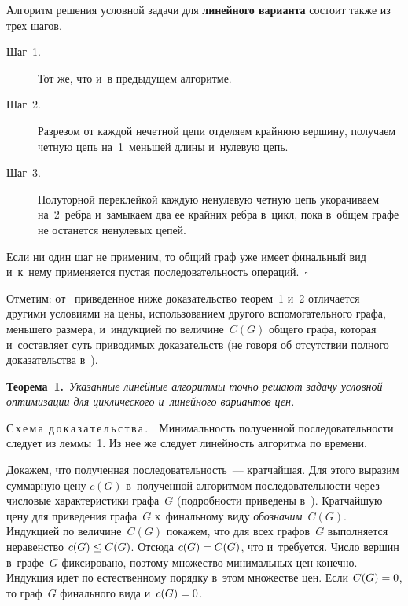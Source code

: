 \begin{multicols}{2}
  Алгоритм решения условной задачи для \textbf{линейного варианта} состоит 
также из трех шагов.
  \begin{description}
  \item[Шаг~1.] Тот же, что и~в предыдущем алгоритме. 
  \item[Шаг~2.] Разрезом от каждой нечетной цепи отделяем крайнюю 
вершину, получаем четную цепь на~1~меньшей длины и~нулевую цепь.
  \item[Шаг~3.] Полуторной переклейкой каждую ненулевую четную цепь 
укорачиваем на~2~реб\-ра и~замыкаем два ее крайних реб\-ра в~цикл, пока 
в~общем графе не останется ненулевых цепей.
  \end{description}
  
  Если ни один шаг не применим, то общий граф уже имеет финальный вид 
и~к~нему применяется пустая последовательность операций.~$\square$
  
  Отметим: от~\cite{4-gor, 5-gor} приведенное ниже доказательство теорем~1 
и~2 отличается другими условиями на цены, использованием другого 
вспомогательного графа, меньшего размера, и~индукцией по величине~$C(G)$ 
общего графа, которая и~со\-став\-ля\-ет суть приводимых доказательств (не говоря 
об отсутствии полного доказательства в~\cite{4-gor, 5-gor}).
  
  \smallskip
  
  \noindent
  \textbf{Теорема~1.}\ \textit{Указанные линейные алгоритмы точно решают 
задачу условной оптимизации для циклического и~линейного вариантов цен.}
  
\columnbreak


  \noindent
  С\,х\,е\,м\,а\ д\,о\,к\,а\,з\,а\,т\,е\,л\,ь\,с\,т\,в\,а\,.\ \ Минимальность 
полученной последовательности следует из леммы~1. Из нее же следует 
линейность алгоритма по вре\-мени. 
  
  Докажем, что полученная последовательность~--- кратчайшая. Для этого 
выразим суммарную цену $c(G)$ в~полученной алгоритмом последовательности 
через числовые характеристики графа~$G$ (подробности приведены 
в~\cite[п.~3]{1-gor}). Кратчайшую цену для приведения графа~$G$ 
к~финальному виду \textit{обозначим}~$C(G)$. Индукцией по 
величине~$C(G)$ покажем, что для всех графов~$G$ выполняется неравенство 
$c(G)\hm\leq C(G)$. Отсюда $c(G)\hm=C(G)$, что и~требуется. Число вершин 
в~графе~$G$ фиксировано, поэтому множество минимальных цен конечно. 
Индукция идет по естественному порядку в~этом множестве цен. Если 
$C(G)\hm= 0$, то граф~$G$ финального вида и~$c(G)\hm=0$.
  

\end{multicols}
